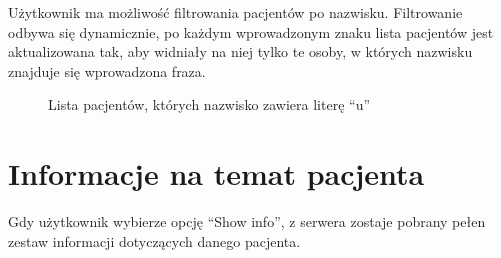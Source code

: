 \documentclass[a4paper]{article}
\begin{document}
Użytkownik ma możliwość filtrowania pacjentów po nazwisku. Filtrowanie odbywa się dynamicznie, po każdym 
wprowadzonym znaku lista pacjentów jest aktualizowana tak, aby widniały na niej tylko 
te osoby, w których nazwisku znajduje się wprowadzona fraza.
\begin{figure}[H]
    \caption{Lista pacjentów, których nazwisko zawiera literę \enquote{u}}
\end{figure}

\pagebreak

\section{Informacje na temat pacjenta}
Gdy użytkownik wybierze opcję \enquote{Show info}, z serwera zostaje pobrany pełen zestaw informacji
dotyczących danego pacjenta.
\end{document}
